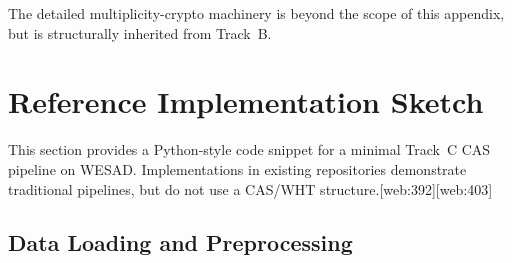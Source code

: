 \documentclass[11pt]{article}
\begin{document}
The detailed multiplicity-crypto machinery is beyond the scope of this appendix, but is structurally inherited from Track~B.

\section{Reference Implementation Sketch}

This section provides a Python-style code snippet for a minimal Track~C CAS pipeline on WESAD. Implementations in existing repositories demonstrate traditional pipelines, but do not use a CAS/WHT structure.\cite{WESAD_JohnsonGitHub,WESAD_MMIImplementation}[web:392][web:403]

\subsection{Data Loading and Preprocessing}
\end{document}
